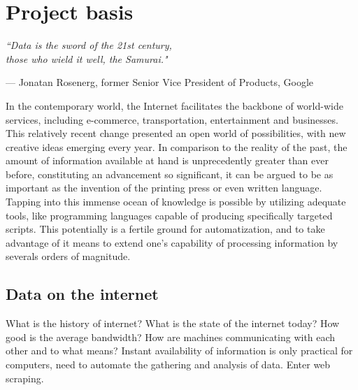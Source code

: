 \chapter{Project basis}
\label{ch:basis}
\setlength{\epigraphwidth}{8.8cm}
\epigraph{\textit{``Data is the sword of the 21st century, \\\hspace{2.4cm}those who wield it well, the Samurai."}}{--- Jonatan Rosenerg, former Senior Vice President of Products, Google}

In the contemporary world, the Internet facilitates the backbone of world-wide services, including e-commerce, transportation, entertainment and businesses. This relatively recent change presented an open world of possibilities, with new creative ideas emerging every year. In comparison to the reality of the past, the amount of information available at hand is unprecedently greater than ever before, constituting an advancement so significant, it can be argued to be as important as the invention of the printing press or even written language. Tapping into this immense ocean of knowledge is possible by utilizing adequate tools, like programming languages capable of producing specifically targeted scripts. This potentially is a fertile ground for automatization, and to take advantage of it means to extend one's capability of processing information by severals orders of magnitude.



\section{Data on the internet}
What is the history of internet?
What is the state of the internet today?
How good is the average bandwidth?
How are machines communicating with each other and to what means?
Instant availability of information is only practical for computers, need to automate the gathering and analysis of data. Enter web scraping.


